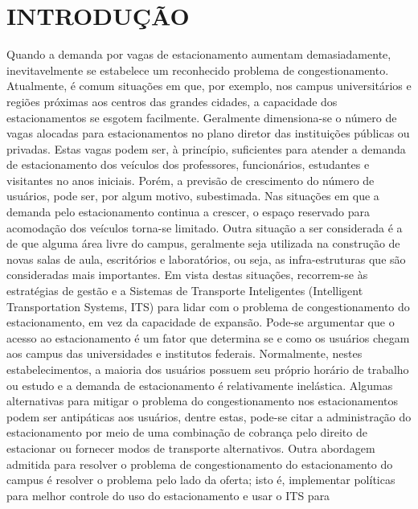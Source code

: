 \chapter{INTRODUÇÃO}

Quando a demanda por vagas de estacionamento aumentam demasiadamente, inevitavelmente se estabelece um reconhecido problema de congestionamento. Atualmente, é comum situações em que, por exemplo, nos campus universitários e regiões próximas aos centros das grandes cidades, a capacidade dos estacionamentos se esgotem facilmente. Geralmente dimensiona-se o número de vagas alocadas para estacionamentos no plano diretor das instituições públicas ou privadas. Estas vagas podem ser, à princípio, suficientes para atender a demanda de estacionamento dos veículos dos professores, funcionários, estudantes e visitantes no
anos iniciais. Porém, a previsão de crescimento do número de usuários, pode ser, por algum motivo, subestimada. Nas situações em que a demanda pelo estacionamento continua a crescer, o espaço reservado para acomodação dos veículos torna-se limitado. Outra situação a ser considerada é a de que 
alguma área livre do campus, geralmente seja utilizada na construção de novas salas de aula, escritórios e laboratórios, ou seja, as infra-estruturas que são consideradas mais importantes.
Em vista destas situações,  recorrem-se às estratégias de gestão e a Sistemas de Transporte Inteligentes (Intelligent
Transportation Systems, ITS) para lidar com o problema de congestionamento do estacionamento, em vez da capacidade de 
expansão.
Pode-se argumentar que o acesso ao estacionamento é um fator que determina se e como os usuários chegam aos
campus das universidades e institutos federais. Normalmente, nestes estabelecimentos, a maioria dos usuários possuem seu próprio horário de trabalho ou estudo e a demanda de estacionamento é relativamente inelástica. 
Algumas alternativas para mitigar o problema do congestionamento nos estacionamentos podem ser antipáticas aos usuários, dentre estas, pode-se citar a
administração do estacionamento por meio de uma combinação de cobrança pelo direito de estacionar ou fornecer modos de transporte alternativos. Outra abordagem admitida para resolver o problema de congestionamento do estacionamento do campus é resolver o problema pelo lado da oferta; isto é, implementar políticas para melhor controle do uso do estacionamento e usar o ITS para
